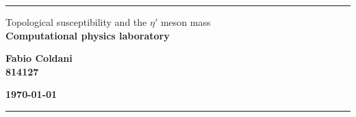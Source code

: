 \begin{titlepage}
\par\noindent\rule{\textwidth}{0.6pt}
  \begin{center}
    {\LARGE{Topological susceptibility and the $\eta'$ meson mass}}\\
  	\vspace{5mm}
  	\textbf{Computational physics laboratory}\\
  	\vspace{15mm}
  \end{center}
\vspace{18mm}

\begin{minipage}[t]{0.47\textwidth}
  {\large{\bf Fabio Coldani\\814127}}
\end{minipage}\hfill\begin{minipage}[t]{0.47\textwidth}\raggedleft
	{\large{\bf \today}}
\end{minipage}
\vspace{5mm}

\noindent\rule{\textwidth}{0.6pt}
\vspace{20mm}


\tableofcontents
\end{titlepage}


